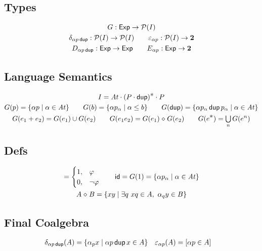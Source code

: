 \documentclass{article}
\newcommand\At{\ensuremath{\mathit{At}}}
\renewcommand\smash{\mathrel{\diamond}}
\newcommand\pdup{\mathop{\mathsf{dup}}}
\newcommand\Two{\mathbf{2}}
\newcommand\Exp{\mathsf{Exp}}
\newcommand\bval[1]{[#1]}
\renewcommand\star{^{\textstyle *}}
\newcommand\id{\mathsf{id}}
\newcommand\sbigcup{\mathop{\textstyle\bigcup}}
\begin{document}
\subsection*{Types}

\begin{gather*}
G: \Exp \fun \powerset I\\
\delta_{\alpha p\pdup} : \powerset I \fun \powerset I
\qquad
\eps_{\alpha p} : \powerset I \fun \Two\\
D_{\alpha p\pdup} : \Exp \fun \Exp
\qquad
E_{\alpha p} : \Exp \fun \Two
\end{gather*}

\subsection*{Language Semantics}

\begin{gather*}
I = \At\cdot (P\cdot\pdup)\star\cdot P\\
G(p) = \set{\alpha p}{\alpha\in\At} \qquad
G(b) = \set{\alpha p_\alpha}{\alpha\leq b} \qquad
G(\pdup) = \set{\alpha p_\alpha\pdup p_\alpha}{\alpha\in\At}\\
G(e_1+e_2) = G(e_1)\cup G(e_2) \qquad
G(e_1e_2) = G(e_1)\smash G(e_2) \qquad
G(e\star) = \sbigcup_n G(e^n)
\end{gather*}

\subsection*{Defs}

\begin{gather*}
\bval\phi = \begin{cases}
1, & \phi\\
0, & \neg\phi
\end{cases}
\qquad
\id = G(1) = \set{\alpha p_\alpha}{\alpha\in\At}\\
A\smash B = \set{xy}{\exists q\ xq\in A,\ \alpha_qy\in B}
\end{gather*}

\subsection*{Final Coalgebra}

\begin{align*}
\delta_{\alpha p\pdup}(A) &= \set{\alpha_p x}{\alpha p\pdup x\in A}
&
\eps_{\alpha p}(A) &= \bval{\alpha p\in A}
\end{align*}
\end{document}
